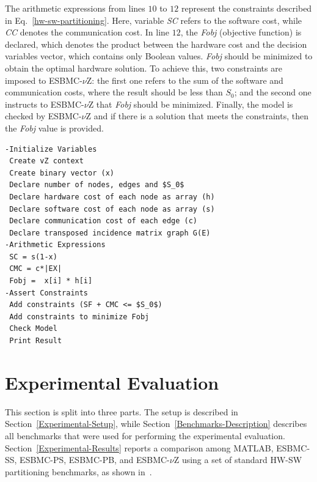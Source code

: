\documentclass{doublecol-new}
\theoremstyle{TH}{
\newtheorem{lemma}{Lemma}
\newtheorem{theorem}[lemma]{Theorem}
\newtheorem{corrolary}[lemma]{Corrolary}
\newtheorem{conjecture}[lemma]{Conjecture}
\newtheorem{proposition}[lemma]{Proposition}
\newtheorem{claim}[lemma]{Claim}
\newtheorem{stheorem}[lemma]{Wrong Theorem}
\newtheorem{algorithm}{Algorithm}
}
\theoremstyle{THrm}{
\newtheorem{definition}{Definition}[section]
\newtheorem{question}{Question}[section]
\newtheorem{remark}{Remark}
\newtheorem{scheme}{Scheme}
}
\theoremstyle{THhit}{
\newtheorem{case}{Case}[section]
}
\begin{document}
The arithmetic expressions from lines $10$ to $12$ represent the constraints described in Eq.~\eqref{hw-sw-partitioning}. Here, variable \textit{SC} refers to the software cost, while \textit{CC} denotes the communication cost. In line $12$, the \textit{Fobj} (objective function) is declared, which denotes the product between the hardware cost and the decision variables vector, which contains only Boolean values. \textit{Fobj} should be minimized to obtain the optimal hardware solution. To achieve this, two constraints are imposed to ESBMC-$\nu$Z: the first one refers to the sum of the software and communication costs, where the result should be less than $S_0$; and the second one instructs to ESBMC-$\nu$Z that \textit{Fobj} should be minimized. Finally, the model is checked by ESBMC-$\nu$Z and if there is a solution that 
meets the constraints, then the \textit{Fobj} value is provided.

\begin{lstlisting}[basicstyle=\footnotesize,caption={Pseudocode describing ESBMC-$\nu$Z.},label={vZ-pseudocode},numbersep=7pt,frame=tb,captionpos=t,numberstyle=\tiny,mathescape=true]
-Initialize Variables
 Create vZ context 
 Create binary vector (x)
 Declare number of nodes, edges and $S_0$
 Declare hardware cost of each node as array (h) 
 Declare software cost of each node as array (s)
 Declare communication cost of each edge (c)
 Declare transposed incidence matrix graph G(E)
-Arithmetic Expressions
 SC = s(1-x)
 CMC = c*|EX|
 Fobj =  x[i] * h[i]
-Assert Constraints
 Add constraints (SF + CMC <= $S_0$)
 Add constraints to minimize Fobj
 Check Model
 Print Result
\end{lstlisting}

\vspace {-2 mm}
\section{Experimental Evaluation}
\label{Experimental-Evaluation}

This section is split into three parts. The setup is described in Section~\ref{Experimental-Setup}, while Section~\ref{Benchmarks-Description} describes all benchmarks that were used for performing the experimental evaluation. Section~\ref{Experimental-Results} reports a comparison among MATLAB, ESBMC-SS, ESBMC-PS, ESBMC-PB, and ESBMC-$\nu$Z using a set of standard HW-SW partitioning benchmarks, as shown in~\cite{Mann2007}.
\end{document}
